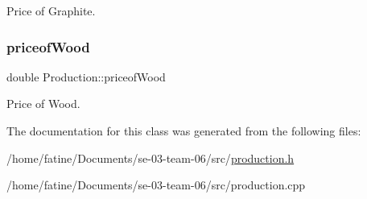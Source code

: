 Price of Graphite. \mbox{\label{classProduction_ac6bc16863f128802bebbb52263d5558c}} 
\subsubsection{\texorpdfstring{priceof\+Wood}{priceofWood}}
{\footnotesize\ttfamily double Production\+::priceof\+Wood}

Price of Wood. 

The documentation for this class was generated from the following files\+:\begin{DoxyCompactItemize}
\item 
/home/fatine/\+Documents/se-\/03-\/team-\/06/src/\hyperlink{production_8h}{production.\+h}\item 
/home/fatine/\+Documents/se-\/03-\/team-\/06/src/production.\+cpp\end{DoxyCompactItemize}
